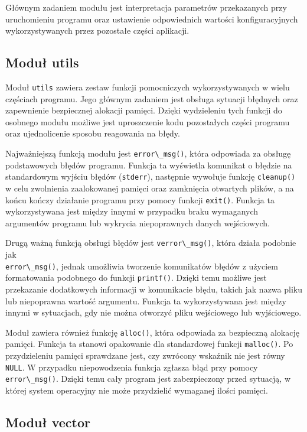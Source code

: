 \documentclass[11pt,a4paper]{article}
\begin{document}
Głównym zadaniem modułu jest interpretacja parametrów przekazanych przy uruchomieniu programu oraz ustawienie odpowiednich wartości konfiguracyjnych wykorzystywanych przez pozostałe części aplikacji.

\subsection{Moduł utils}

Moduł \verb|utils| zawiera zestaw funkcji pomocniczych wykorzystywanych w wielu częściach programu. Jego głównym zadaniem jest obsługa sytuacji błędnych oraz zapewnienie bezpiecznej alokacji pamięci. Dzięki wydzieleniu tych funkcji do osobnego modułu możliwe jest uproszczenie kodu pozostałych części programu oraz ujednolicenie sposobu reagowania na błędy.

Najważniejszą funkcją modułu jest \verb|error\_msg()|, która odpowiada za obsługę podstawowych błędów programu. Funkcja ta wyświetla komunikat 
o błędzie na standardowym wyjściu błędów (\verb|stderr|), następnie wywołuje funkcję \verb|cleanup()| w celu zwolnienia zaalokowanej pamięci oraz zamknięcia otwartych plików, a na końcu kończy działanie programu przy pomocy funkcji \verb|exit()|. Funkcja ta wykorzystywana jest między innymi w przypadku braku wymaganych argumentów programu lub wykrycia niepoprawnych danych wejściowych.

Drugą ważną funkcją obsługi błędów jest \verb|verror\_msg()|, która działa podobnie jak \\ \verb|error\_msg()|, jednak umożliwia tworzenie komunikatów błędów z użyciem formatowania podobnego do funkcji \verb|printf()|. Dzięki temu możliwe jest przekazanie dodatkowych informacji w komunikacie błędu, takich jak nazwa pliku lub niepoprawna wartość argumentu. Funkcja ta wykorzystywana jest między innymi w sytuacjach, gdy nie można otworzyć pliku wejściowego lub wyjściowego.

Moduł zawiera również funkcję \verb|alloc()|, która odpowiada za bezpieczną alokację pamięci. Funkcja ta stanowi opakowanie dla standardowej funkcji \verb|malloc()|. Po przydzieleniu pamięci sprawdzane jest, czy zwrócony wskaźnik nie jest równy \verb|NULL|. W przypadku niepowodzenia funkcja zgłasza błąd przy pomocy \verb|error\_msg()|. Dzięki temu cały program jest zabezpieczony przed sytuacją, w której system operacyjny nie może przydzielić wymaganej ilości pamięci.

\subsection{Moduł vector}
\end{document}
